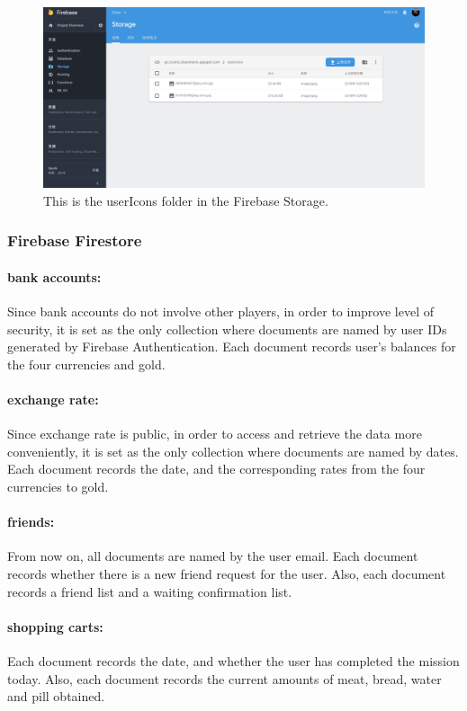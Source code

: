 \documentclass[12pt]{article}
\begin{document}
\begin{figure}
	\centering
	\includegraphics[scale=0.2]{Storage.png}
	\caption{\label{fig:storage}This is the userIcons folder in the Firebase Storage.}
\end{figure}
\subsubsection{Firebase Firestore}
\paragraph{bank accounts:}
Since bank accounts do not involve other players, in order to improve level of security, it is set as the only collection where documents are named by user IDs generated by Firebase Authentication. Each document records user's balances for the four currencies and gold.
\paragraph{exchange rate:}
Since exchange rate is public, in order to access and retrieve the data more conveniently, it is set as the only collection where documents are named by dates. Each document records the date, and the corresponding rates from the four currencies to gold.
\paragraph{friends:}
From now on, all documents are named by the user email. Each document records whether there is a new friend request for the user. Also, each document records a friend list and a waiting confirmation list.
\paragraph{shopping carts:}
Each document records the date, and whether the user has completed the mission today. Also, each document records the current amounts of meat, bread, water and pill obtained.
\end{document}
